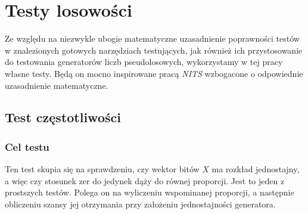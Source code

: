 \section{Testy losowości}
Ze względu na niezwykle ubogie matematyczne uzasadnienie poprawności testów w znalezionych gotowych narzędziach testujących, jak również ich przystosowanie do testowania generatorów liczb pseudolosowych, wykorzystamy w tej pracy własne testy. Będą on mocno inspirowane pracą \emph{NITS} \cite{nist} wzbogacone o odpowiednie uzasadnienie matematyczne.
\subsection{Test częstotliwości}
\subsubsection{Cel testu}
Ten test skupia się na sprawdzeniu, czy wektor bitów $X$ ma rozkład jednostajny, a więc czy stosunek zer do jedynek dąży do równej proporcji. Jest to jeden z prostszych testów. Polega on na wyliczeniu wspominanej proporcji, a następnie obliczeniu szansy jej otrzymania przy założeniu jednostajności generatora. 
